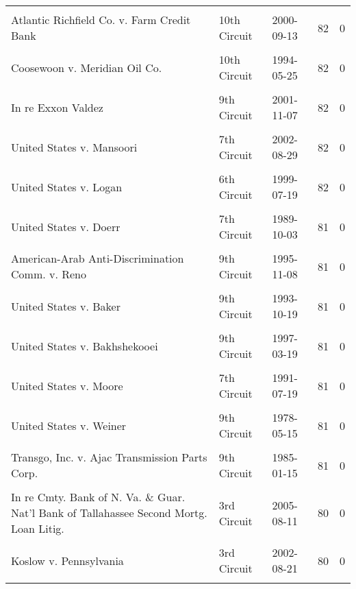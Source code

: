 \documentclass[10pt, letterpaper]{article}
\begin{document}
\begin{spacing}{1.0}
\begin{footnotesize}
\begin{longtable}[H]{p{3.5in}llrr}
        & & & &\\[-6pt]
        Atlantic Richfield Co. v. Farm Credit Bank & 10th Circuit & 2000-09-13 & 82 & 0\\
        & & & &\\[-6pt]
        Coosewoon v. Meridian Oil Co. & 10th Circuit & 1994-05-25 & 82 & 0\\
        & & & &\\[-6pt]
        In re Exxon Valdez & 9th Circuit & 2001-11-07 & 82 & 0\\
        & & & &\\[-6pt]
        United States v. Mansoori & 7th Circuit & 2002-08-29 & 82 & 0\\
        & & & &\\[-6pt]
        United States v. Logan & 6th Circuit & 1999-07-19 & 82 & 0\\
        & & & &\\[-6pt]
        United States v. Doerr & 7th Circuit & 1989-10-03 & 81 & 0\\
        & & & &\\[-6pt]
        American-Arab Anti-Discrimination Comm. v. Reno & 9th Circuit & 1995-11-08 & 81 & 0\\
        & & & &\\[-6pt]
        United States v. Baker & 9th Circuit & 1993-10-19 & 81 & 0\\
        & & & &\\[-6pt]
        United States v. Bakhshekooei & 9th Circuit & 1997-03-19 & 81 & 0\\
        & & & &\\[-6pt]
        United States v. Moore & 7th Circuit & 1991-07-19 & 81 & 0\\
        & & & &\\[-6pt]
        United States v. Weiner & 9th Circuit & 1978-05-15 & 81 & 0\\
        & & & &\\[-6pt]
        Transgo, Inc. v. Ajac Transmission Parts Corp. & 9th Circuit & 1985-01-15 & 81 & 0\\
        & & & &\\[-6pt]
        In re Cmty. Bank of N. Va. \& Guar. Nat'l Bank of Tallahassee Second Mortg. Loan Litig. & 3rd Circuit & 2005-08-11 & 80 & 0\\
        & & & &\\[-6pt]
        Koslow v. Pennsylvania & 3rd Circuit & 2002-08-21 & 80 & 0\\
        & & & &\\[-6pt]

\end{longtable}
\end{footnotesize}
\end{spacing}
\end{document}
